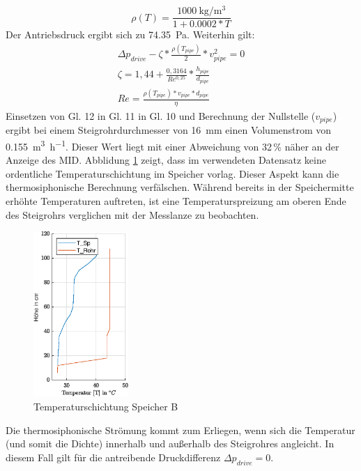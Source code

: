 \begin{equation}
	\label{eq:dens}
	\rho(T)=\frac{\SI{1000}{\kilogram\per\cubic\meter}}{1+0.0002*T}
\end{equation}
Der Antriebsdruck ergibt sich zu \SI{74,35}{\pascal}. Weiterhin gilt:
\begin{align}
	\Delta p_{drive}-\zeta*\frac{\rho(T_{pipe})}{2}*v_{pipe}^2=0\\
	\zeta=1,44+\frac{0,3164}{Re^{0,25}}*\frac{h_{pipe}}{d_{pipe}}\\
	Re=\frac{\rho(T_{pipe})*v_{pipe}*d_{pipe}}{\eta}
\end{align}
Einsetzen von Gl. 12 in Gl. 11 in Gl. 10 und Berechnung der Nullstelle ($v_{pipe}$) ergibt bei einem Steigrohrdurchmesser von \SI{16}{mm} einen Volumenstrom von \SI{0,155}{\cubic\meter\per\hour}. Dieser Wert liegt mit einer Abweichung von 32\,\% näher an der Anzeige des MID. Abblidung \ref{fig:temp} zeigt, dass im verwendeten Datensatz keine ordentliche Temperaturschichtung im Speicher vorlag. Dieser Aspekt kann die thermosiphonische Berechnung verfälschen. Während bereits in der Speichermitte erhöhte Temperaturen auftreten, ist eine Temperaturspreizung am oberen Ende des Steigrohrs verglichen mit der Messlanze zu beobachten. 
\begin{figure}[H]
	\centering
	\includegraphics[width=0.32\textwidth]{../DATA/siphon.eps}
	\caption[Temperaturschichtung Speicher B]{Temperaturschichtung Speicher B}
	\label{fig:temp}
\end{figure}
Die thermosiphonische Strömung kommt zum Erliegen, wenn sich die Temperatur (und somit die Dichte) innerhalb und außerhalb des Steigrohres angleicht. In diesem Fall gilt für die antreibende Druckdifferenz $\Delta p_{drive}=0$.  


